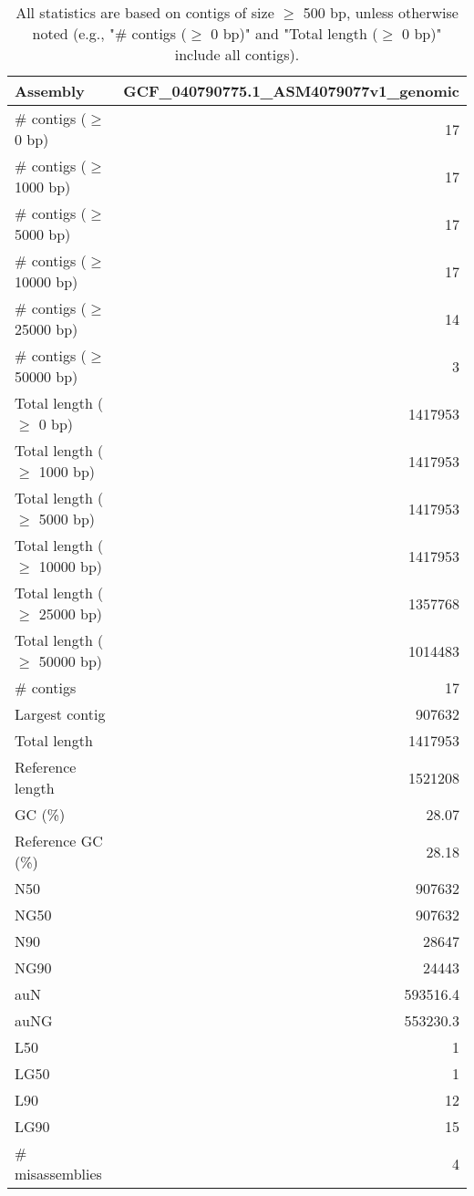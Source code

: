 \documentclass[12pt,a4paper]{article}
\begin{document}
\begin{table}[ht]
\begin{center}
\caption{All statistics are based on contigs of size $\geq$ 500 bp, unless otherwise noted (e.g., "\# contigs ($\geq$ 0 bp)" and "Total length ($\geq$ 0 bp)" include all contigs).}
\begin{tabular}{|l*{1}{|r}|}
\hline
Assembly & GCF\_040790775.1\_ASM4079077v1\_genomic \\ \hline
\# contigs ($\geq$ 0 bp) & 17 \\ \hline
\# contigs ($\geq$ 1000 bp) & 17 \\ \hline
\# contigs ($\geq$ 5000 bp) & 17 \\ \hline
\# contigs ($\geq$ 10000 bp) & 17 \\ \hline
\# contigs ($\geq$ 25000 bp) & 14 \\ \hline
\# contigs ($\geq$ 50000 bp) & 3 \\ \hline
Total length ($\geq$ 0 bp) & 1417953 \\ \hline
Total length ($\geq$ 1000 bp) & 1417953 \\ \hline
Total length ($\geq$ 5000 bp) & 1417953 \\ \hline
Total length ($\geq$ 10000 bp) & 1417953 \\ \hline
Total length ($\geq$ 25000 bp) & 1357768 \\ \hline
Total length ($\geq$ 50000 bp) & 1014483 \\ \hline
\# contigs & 17 \\ \hline
Largest contig & 907632 \\ \hline
Total length & 1417953 \\ \hline
Reference length & 1521208 \\ \hline
GC (\%) & 28.07 \\ \hline
Reference GC (\%) & 28.18 \\ \hline
N50 & 907632 \\ \hline
NG50 & 907632 \\ \hline
N90 & 28647 \\ \hline
NG90 & 24443 \\ \hline
auN & 593516.4 \\ \hline
auNG & 553230.3 \\ \hline
L50 & 1 \\ \hline
LG50 & 1 \\ \hline
L90 & 12 \\ \hline
LG90 & 15 \\ \hline
\# misassemblies & 4 \\ \hline

\end{tabular}
\end{center}
\end{table}
\end{document}
